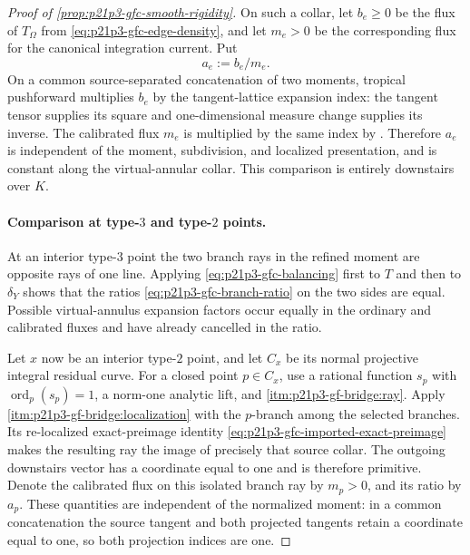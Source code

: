 \begin{proof}[Proof of \cref{prop:p21p3-gfc-smooth-rigidity}]
On such a collar, let $b_e\geq0$ be the flux of $T_\Omega$ from
\eqref{eq:p21p3-gfc-edge-density}, and let $m_e>0$ be the corresponding
flux for the canonical integration current.  Put
\begin{equation}
\label{eq:p21p3-gfc-branch-ratio}
                              a_e:=b_e/m_e.
\end{equation}
On a common source-separated concatenation of two moments, tropical
pushforward multiplies $b_e$ by the tangent-lattice expansion index:
the tangent tensor supplies its square and one-dimensional measure change
supplies its inverse.  The calibrated flux $m_e$ is multiplied by the
same index by \cite[\S14.3.2, Lemma~14.3.4, and
Proposition~14.4.2]{CLD25}.  Therefore $a_e$ is independent of the
moment, subdivision, and localized presentation, and is constant along
the virtual-annular collar.  This comparison is entirely downstairs over
$K$.

\paragraph{Comparison at type-$3$ and type-$2$ points.}
At an interior type-$3$ point the two branch rays in the refined moment
are opposite rays of one line.  Applying
\eqref{eq:p21p3-gfc-balancing} first to $T$ and then to $\delta_Y$
shows that the ratios \eqref{eq:p21p3-gfc-branch-ratio} on the two sides
are equal.  Possible virtual-annulus expansion factors occur equally in
the ordinary and calibrated fluxes and have already cancelled in the
ratio.

Let $x$ now be an interior type-$2$ point, and let $C_x$ be its
normal projective integral residual curve.  For a closed point
$p\in C_x$, use a rational function $s_p$ with
$\operatorname{ord}_p(s_p)=1$, a norm-one analytic lift, and
\cref{itm:p21p3-gf-bridge:ray}.  Apply
\cref{itm:p21p3-gf-bridge:localization} with the $p$-branch among the
selected branches.  Its re-localized exact-preimage identity
\eqref{eq:p21p3-gfc-imported-exact-preimage} makes the resulting ray the
image of precisely that source collar.  The outgoing downstairs vector
has a coordinate equal to one and is therefore primitive.  Denote the
calibrated flux on this isolated branch ray by $m_p>0$, and its ratio by
$a_p$.  These quantities are independent of the normalized moment: in
a common concatenation the source tangent and both projected tangents
retain a coordinate equal to one, so both projection indices are one.


\end{proof}

